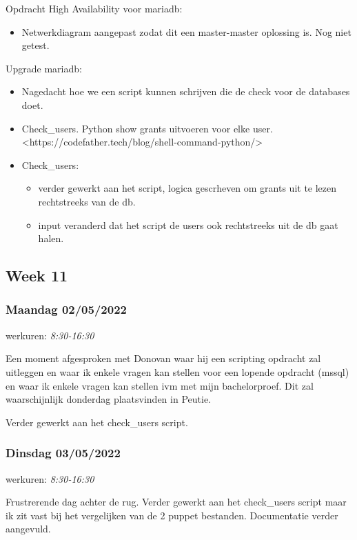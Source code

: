 Opdracht High Availability voor mariadb:

\begin{itemize}
    \item Netwerkdiagram aangepast zodat dit een master-master oplossing is. Nog niet getest. 
\end{itemize}

Upgrade mariadb:

\begin{itemize}
    \item Nagedacht hoe we een script kunnen schrijven die de check voor de databases doet.
    \item Check\_users. Python show grants uitvoeren voor elke user. <https://codefather.tech/blog/shell-command-python/>
    \item Check\_users:
    \begin{itemize}
        \item verder gewerkt aan het script, logica gescrheven om grants uit te lezen rechtstreeks van de db.
        \item input veranderd dat het script de users ook rechtstreeks uit de db gaat halen.
    \end{itemize}
\end{itemize}


\subsection{Week 11}

\subsubsection{Maandag 02/05/2022}

werkuren: \emph{8:30-16:30}

Een moment afgesproken met Donovan waar hij een scripting opdracht zal uitleggen en waar ik enkele vragen kan stellen voor een lopende opdracht (mssql) en waar ik enkele vragen kan stellen ivm met mijn bachelorproef. Dit zal waarschijnlijk donderdag plaatsvinden in Peutie.

Verder gewerkt aan het check\_users script.

\subsubsection{Dinsdag 03/05/2022}

werkuren: \emph{8:30-16:30}

Frustrerende dag achter de rug. Verder gewerkt aan het check\_users script maar ik zit vast bij het vergelijken van de 2 puppet bestanden. Documentatie verder aangevuld.


